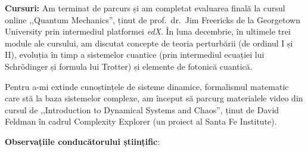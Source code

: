 \vspace{0.5em}

\textbf{Cursuri:}
Am terminat de parcurs și am completat evaluarea finală la cursul online ,,Quantum Mechanics'', ținut de prof.~dr.~Jim Freericks de la Georgetown University prin intermediul platformei \textit{edX}. În luna decembrie, în ultimele trei module ale cursului, am discutat concepte de teoria perturbării (de ordinul I și II), evoluția în timp a sistemelor cuantice (prin intermediul ecuației lui Schrödinger și formula lui Trotter) și elemente de fotonică cuantică.

Pentru a-mi extinde cunoștințele de sisteme dinamice, formalismul matematic care stă la baza sistemelor complexe, am început să parcurg materialele video din cursul de ,,Introduction to Dynamical Systems and Chaos'', ținut de David Feldman în cadrul Complexity Explorer (un proiect al Santa Fe Institute).

\vspace{0.5em}

\textbf{Observațiile conducătorului științific}:

\vspace{2em}

